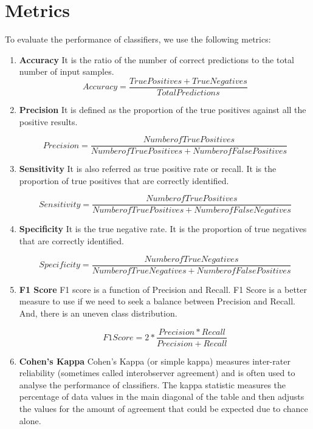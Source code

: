 \documentclass[]{article}
\begin{document}
\section{Metrics}
\label{sec:metrics}

To evaluate the performance of classifiers, we use the following
metrics:

\begin{enumerate}
\item \textbf{Accuracy}
It is the ratio of the number of correct predictions to the total number of input samples.
\begin{equation}
Accuracy = \frac{True Positives + True Negatives} {Total Predictions}
\end{equation}

\item \textbf{Precision}
It is defined as the proportion of the true positives against all the positive
results.

\begin{equation}
Precision = \frac{Number of True Positives} {Number of True Positives + Number of False Positives}
\end{equation}

\item \textbf{Sensitivity}
It is also referred as true positive rate or recall. It is the proportion of true positives that are correctly identified.

\begin{equation}
Sensitivity = \frac{Number of True Positives} {Number of True Positives + Number of False Negatives}
\end{equation}


\item \textbf{Specificity}
It is the true negative rate. It is the proportion of true negatives that are
correctly identified.

\begin{equation}
Specificity = \frac{Number of True Negatives} {Number of True Negatives + Number of False Positives}
\end{equation}

\item \textbf{F1 Score}
F1 score is a function of Precision and Recall. F1 Score is a better measure to use if we need to seek a balance between Precision and Recall. And, there is an uneven class distribution.


\begin{equation}
F1 Score = 2 * \frac{Precision * Recall} {Precision + Recall}
\end{equation}

\item \textbf{Cohen's Kappa}
Cohen's Kappa (or simple kappa) measures inter-rater reliability (sometimes called interobserver agreement) and is often used to analyse the performance of classifiers. The kappa statistic measures the percentage of data values in the main diagonal of the table and then adjusts the values for the amount of agreement that could be expected due to chance alone.

\end{enumerate}
\end{document}
